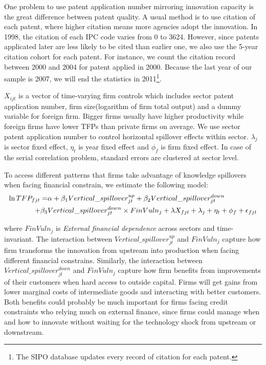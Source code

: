 \documentclass[12pt]{article}%
\begin{document}
\begin{CJK*}{GBK}{fs}
One problem to use patent application number mirroring innovation capacity is the great difference between patent quality. A usual method is to use citation of each patent, where higher citation means more agencies adopt the innovation. In 1998, the citation of each IPC code varies from 0 to 3624. However, since patents applicated later are less likely to be cited than earlier one, we also use the 5-year citation cohort for each patent. For instance, we count the citation record between 2000 and 2004 for patent applied in 2000. Because the last year of our sample is 2007, we will end the statistics in 2011\footnote{\scriptsize The SIPO database updates every record of citation for each patent.}. \par

$X_{ijt}$ is a vector of time-varying firm controls which includes sector patent application number, firm size(logarithm of firm total output) and a dummy variable for foreign firm. Bigger firms usually have higher productivity while foreign firms have lower TFPs than private firms on average. We use sector patent application number to control horizontal spillover effects within sector. $\lambda_{j}$ is sector fixed effect, $\eta_{t}$ is year fixed effect and $\phi_{f}$ is firm fixed effect. In case of the serial correlation problem, standard errors are clustered at sector level.
\par
To access different patterns that firms take advantage of knowledge spillovers when facing financial constrain, we estimate the following model:
\begin{align}
   \ln TFP_{fjt}= & \alpha+\beta_1 Vertical\_spillover_{jt}^{up}+\beta_2 Vertical\_spillover_{jt}^{down} \notag  \\
      +\beta_3    &  Vertical\_spillover_{jt}^{down} \times FinVuln_j+\lambda X_{fjt}+\lambda_{j}+\eta_{t}+\phi_{f}+\epsilon_{fjt}
\end{align}

where $FinVuln_j$ is \emph{External financial dependence} across sectors and time-invariant. The interaction between $Vertical\_spillover_{jt}^{up}$ and $FinVuln_j$ capture how firm transforms the innovation from upstream into production when facing different financial constrains. Similarly, the interaction between $Vertical\_spillover_{jt}^{down}$ and $FinVuln_j$ capture how firm benefits from improvements of their customers when hard access to outside capital. Firms will get gains from lower marginal costs of intermediate goods and interacting with better customers. Both benefits could probably be much important for firms facing credit constraints who relying much on external finance, since firms could manage when and how to innovate without waiting for the technology shock from upstream or downstream. \par



\end{CJK*}
\end{document}
